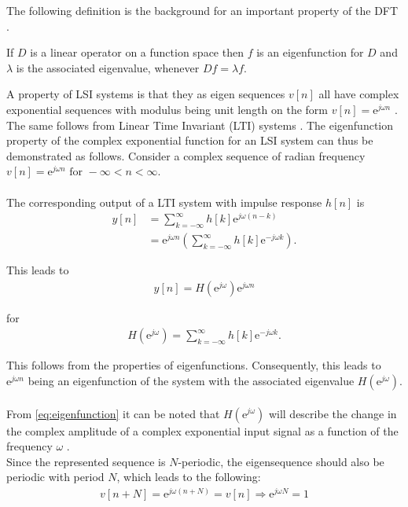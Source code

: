 The following definition is the background for an important property of the DFT \cite{Eigenfunctions}.

\begin{definition}
If $D$ is a linear operator on a function space then $f$ is an eigenfunction for $D$ and $\lambda$ is the associated eigenvalue, whenever $Df = \lambda f$.
\end{definition}

A property of LSI systems is that they as eigen sequences $v[n]$ all have complex exponential sequences with modulus being unit length on the form $v[n] = \text{e}^{j \omega n}$ \cite{FSP}.\\ The same follows from Linear Time Invariant (LTI) systems \cite{DTSP}.
The eigenfunction property of the complex exponential function for an LSI system can thus be demonstrated as follows. Consider a complex sequence of radian frequency $v[n] = \text{e}^{j\omega n} \text{ for } -\infty < n < \infty$.
\\\\
The corresponding output of a LTI system with impulse response $h[n]$ is
\begin{align*}
y[n] 
&= \sum_{k=-\infty}^{\infty} h[k]\text{e}^{j\omega(n-k)} \nonumber \\ 
&= \text{e}^{j\omega n} \left(\sum_{k=-\infty}^{\infty} h[k]\text{e}^{-j\omega k} \right).
\end{align*}

This leads to
\begin{align}\label{eq:eigenfunction}
y[n] = H(\text{e}^{j \omega}) \text{e}^{j\omega n}
\end{align}

for
\begin{align*}
H(\text{e}^{j\omega}) = \sum_{k=-\infty}^{\infty} h[k]\text{e}^{-j\omega k}.
\end{align*}

This follows from the properties of eigenfunctions. Consequently, this leads to $\text{e}^{j\omega n}$ being an eigenfunction of the system with the associated eigenvalue $H(\text{e}^{j\omega})$.
\\\\
From \eqref{eq:eigenfunction} it can be noted that $H(\text{e}^{j\omega})$ will describe the change in the complex amplitude of a complex exponential input signal as a function of the frequency $\omega$ \cite{DTSP}. 
\\
Since the represented sequence is $N$-periodic, the eigensequence should also be periodic with period $N$, which leads to the following:
\begin{align*}
v[n+N] = \text{e}^{j\omega (n+N)} = v[n] \Rightarrow \text{e}^{j\omega N} = 1
\end{align*}

